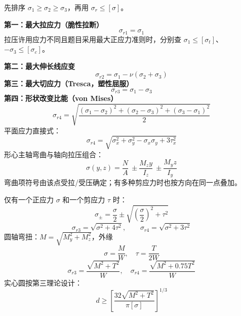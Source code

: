 \documentclass[a4paper,10pt,fontset=none]{ctexart}
\begin{document}
\begin{rightcol}
先排序 $\sigma_1\ge\sigma_2\ge\sigma_3$，再用 $\sigma_r\le[\sigma]$。

\textbf{第一：最大拉应力（脆性拉断）}
\[
\sigma_{r1}=\sigma_1
\]
拉压许用应力不同且题目采用最大正应力准则时，分别查 $\sigma_1\le[\sigma_t]$、$-\sigma_3\le[\sigma_c]$。

\textbf{第二：最大伸长线应变}
\[
\sigma_{r2}=\sigma_1-\nu(\sigma_2+\sigma_3)
\]
\textbf{第三：最大切应力（Tresca，塑性屈服）}
\[
\sigma_{r3}=\sigma_1-\sigma_3
\]
\textbf{第四：形状改变比能（von Mises）}
\[
\sigma_{r4}=\sqrt{\frac{(\sigma_1-\sigma_2)^2+(\sigma_2-\sigma_3)^2+(\sigma_3-\sigma_1)^2}{2}}
\]
平面应力直接式：
\[
\sigma_{r4}=\sqrt{\sigma_x^2+\sigma_y^2-\sigma_x\sigma_y+3\tau_x^2}
\]
形心主轴弯曲与轴向拉压组合：
\[
\sigma(y,z)=\frac NA\ \pm\frac{M_z y}{I_z}\ \pm\frac{M_y z}{I_y}
\]
弯曲项符号由该点受拉/受压确定；有多种剪应力时也按方向在同一点叠加。

仅有一个正应力 $\sigma$ 和一个剪应力 $\tau$ 时：
\[
\sigma_\pm=\frac\sigma2\pm\sqrt{\left(\frac\sigma2\right)^2+\tau^2}
\]
\[
\boxed{\sigma_{r3}=\sqrt{\sigma^2+4\tau^2}},\qquad
\boxed{\sigma_{r4}=\sqrt{\sigma^2+3\tau^2}}
\]
圆轴弯扭：$M=\sqrt{M_y^2+M_z^2}$，外缘
\[
\sigma=\frac MW,\quad \tau=\frac{T}{2W}
\]
\[
\sigma_{r3}=\frac{\sqrt{M^2+T^2}}W,\quad
\sigma_{r4}=\frac{\sqrt{M^2+0.75T^2}}W
\]
实心圆按第三理论设计：
\[
d\ge\left[\frac{32\sqrt{M^2+T^2}}{\pi[\sigma]}\right]^{1/3}
\]
\end{rightcol}
\end{document}
